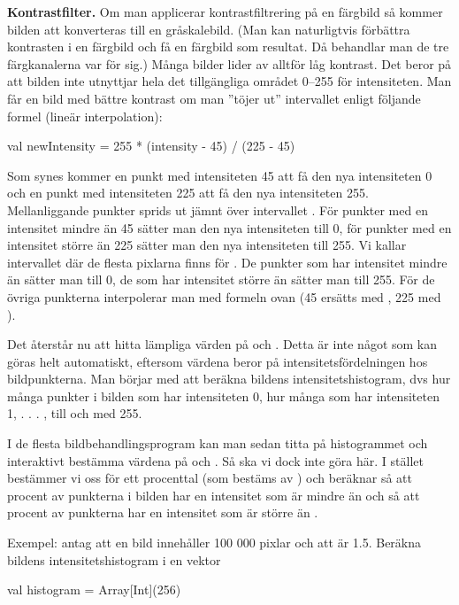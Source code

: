 \Task \textbf{Kontrastfilter.} Om man applicerar kontrastfiltrering på en färgbild så kommer bilden att konverteras till en gråskalebild. (Man kan naturligtvis förbättra kontrasten i en färgbild och få en färgbild som resultat. Då behandlar man de tre färgkanalerna var för sig.) Många bilder lider av alltför låg kontrast. Det beror på att bilden inte utnyttjar hela det tillgängliga området 0–255 för intensiteten. Man får en bild med bättre kontrast om man ''töjer ut'' intervallet enligt följande formel (lineär interpolation):

\begin{Code}
val newIntensity = 255 * (intensity - 45) / (225 - 45)
\end{Code}

Som synes kommer en punkt med intensiteten 45 att få den nya intensiteten 0 och en punkt med intensiteten 225 att få den nya intensiteten 255. Mellanliggande punkter sprids ut jämnt över intervallet \code{[0, 255]}. För punkter med en intensitet mindre än 45 sätter man den nya intensiteten till 0, för punkter med en intensitet större än 225 sätter man den nya intensiteten till 255. Vi kallar intervallet där de flesta pixlarna finns för . De punkter som har intensitet mindre än  sätter man till 0, de som har intensitet större än  sätter man till 255. För de övriga punkterna interpolerar man med formeln ovan (45 ersätts med , 225 med ).

Det återstår nu att hitta lämpliga värden på  och . Detta är inte något som kan göras helt automatiskt, eftersom värdena beror på intensitetsfördelningen hos bildpunkterna. Man börjar med att beräkna bildens intensitetshistogram, dvs hur många punkter i bilden som har intensiteten 0, hur många som har intensiteten 1, . . . , till och med 255.

I de flesta bildbehandlingsprogram kan man sedan titta på histogrammet och interaktivt bestämma värdena på  och . Så ska vi dock inte göra här. I stället bestämmer vi oss för ett procenttal  (som bestäms av ) och beräknar  så att  procent av punkterna i bilden har en intensitet som är mindre än  och  så att  procent av punkterna har en intensitet som är större än .

Exempel: antag att en bild innehåller 100 000 pixlar och att  är 1.5. Beräkna bildens intensitetshistogram i en vektor
\begin{Code} 
val histogram = Array[Int](256)
\end{Code}

